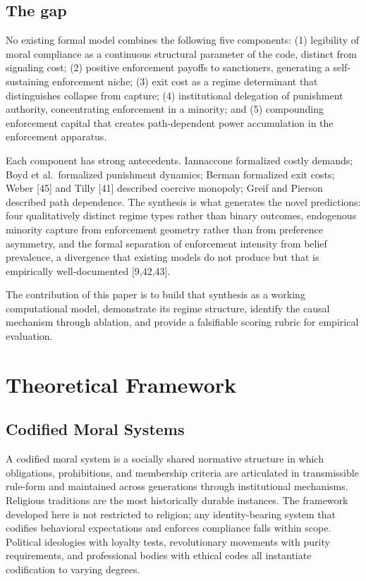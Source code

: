 \documentclass[12pt]{article}
\begin{document}
%
\subsection{The gap}

No existing formal model combines the following five components: (1) legibility of moral compliance as a continuous structural parameter of the code, distinct from signaling cost; (2) positive enforcement payoffs to sanctioners, generating a self-sustaining enforcement niche; (3) exit cost as a regime determinant that distinguishes collapse from capture; (4) institutional delegation of punishment authority, concentrating enforcement in a minority; and (5) compounding enforcement capital that creates path-dependent power accumulation in the enforcement apparatus.

Each component has strong antecedents. Iannaccone formalized costly demands; Boyd et al.~formalized punishment dynamics; Berman formalized exit costs; Weber [45] and Tilly [41] described coercive monopoly; Greif and Pierson described path dependence. The synthesis is what generates the novel predictions: four qualitatively distinct regime types rather than binary outcomes, endogenous minority capture from enforcement geometry rather than from preference asymmetry, and the formal separation of enforcement intensity from belief prevalence, a divergence that existing models do not produce but that is empirically well-documented [9,42,43].

The contribution of this paper is to build that synthesis as a working computational model, demonstrate its regime structure, identify the causal mechanism through ablation, and provide a falsifiable scoring rubric for empirical evaluation.

%
\section{Theoretical Framework}

%
\subsection{Codified Moral Systems}

A codified moral system is a socially shared normative structure in which obligations, prohibitions, and membership criteria are articulated in transmissible rule-form and maintained across generations through institutional mechanisms. Religious traditions are the most historically durable instances. The framework developed here is not restricted to religion; any identity-bearing system that codifies behavioral expectations and enforces compliance falls within scope. Political ideologies with loyalty tests, revolutionary movements with purity requirements, and professional bodies with ethical codes all instantiate codification to varying degrees.
\end{document}
